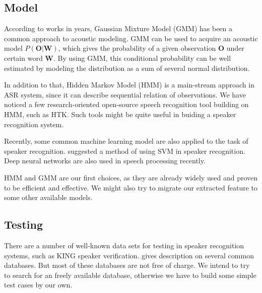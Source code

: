 \subsection{Model}
According to works in years, Gaussian Mixture Model (GMM)
has been a common approach to acoustic modeling.\cite{GMM}
GMM can be used to acquire an acoustic model $P(\mathbf{O} | \mathbf{W}) $,
which gives the probability of a given observation
$\mathbf{O}$ under certain word $\mathbf{W}$. By using GMM, this
conditional probability can be well estimated by modeling the distribution as
a sum of several normal distribution.

In addition to that, Hidden Markov Model (HMM) is a main-stream approach in ASR system,
since it can describe sequential relation of observations.\cite{SLP}
We have noticed a few research-oriented open-source speech recognition
tool building on HMM, such as HTK\cite{htk}.
Such tools might be quite useful in buiding a speaker recognition system.

Recently, some common machine learning model are also applied to the task of speaker
recognition. \cite{svm} suggested a method of using SVM in speaker recognition.
Deep neural networks are also used in speech processing recently.\cite{deep}

HMM and GMM are our first choices, as they are already widely used and proven to be
efficient and effective.  We might also try to migrate our extracted feature to
some other available models.

\subsection{Testing}
There are a number of well-known data sets for testing in speaker recognition systems,
such as KING speaker verification\cite{king}. \cite{database} gives description on
several common databases. But most of these databases are not free of charge.
We intend to try to search for an freely available database,
otherwise we have to build some simple test cases by our own.

